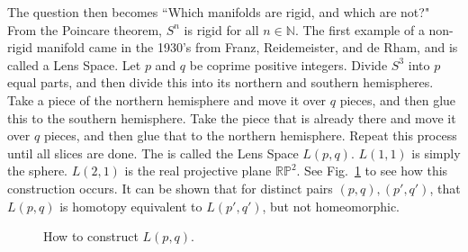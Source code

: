 \documentclass{article}
\theoremstyle{mystyle}
\begin{document}
The question then becomes ``Which manifolds are rigid, and which are not?" From the Poincare theorem, $S^{n}$ is rigid for all $n\in \mathbb{N}$. The first example of a non-rigid manifold came in the 1930's from Franz, Reidemeister, and de Rham, and is called a Lens Space. Let $p$ and $q$ be coprime positive integers. Divide $S^{3}$ into $p$ equal parts, and then divide this into its northern and southern hemispheres. Take a piece of the northern hemisphere and move it over $q$ pieces, and then glue this to the southern hemisphere. Take the piece that is already there and move it over $q$ pieces, and then glue that to the northern hemisphere. Repeat this process until all slices are done. The is called the Lens Space $L(p,q)$. $L(1,1)$ is simply the sphere. $L(2,1)$ is the real projective plane $\mathbb{RP}^{2}$. See Fig.~\ref{fig:surgery_theory_lens_space_drawing} to see how this construction occurs. It can be shown that for distinct pairs $(p,q), (p',q')$, that $L(p,q)$ is homotopy equivalent to $L(p',q')$, but not homeomorphic.
\begin{figure}[H]
    \centering
    \caption{How to construct $L(p,q)$.}
    \label{fig:surgery_theory_lens_space_drawing}
\end{figure}
\end{document}
